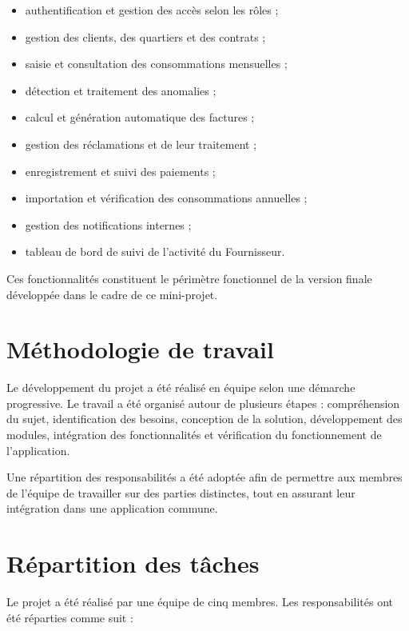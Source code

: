 \begin{itemize}[leftmargin=*]
    \item authentification et gestion des accès selon les rôles ;
    \item gestion des clients, des quartiers et des contrats ;
    \item saisie et consultation des consommations mensuelles ;
    \item détection et traitement des anomalies ;
    \item calcul et génération automatique des factures ;
    \item gestion des réclamations et de leur traitement ;
    \item enregistrement et suivi des paiements ;
    \item importation et vérification des consommations annuelles ;
    \item gestion des notifications internes ;
    \item tableau de bord de suivi de l'activité du Fournisseur.
\end{itemize}

Ces fonctionnalités constituent le périmètre fonctionnel de la version finale développée dans le cadre de ce mini-projet.

\section{Méthodologie de travail}

Le développement du projet a été réalisé en équipe selon une démarche progressive. Le travail a été organisé autour de plusieurs étapes : compréhension du sujet, identification des besoins, conception de la solution, développement des modules, intégration des fonctionnalités et vérification du fonctionnement de l'application.

Une répartition des responsabilités a été adoptée afin de permettre aux membres de l'équipe de travailler sur des parties distinctes, tout en assurant leur intégration dans une application commune.

\section{Répartition des tâches}

Le projet a été réalisé par une équipe de cinq membres. Les responsabilités ont été réparties comme suit :

